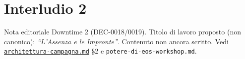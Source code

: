 \chapter*{Interludio 2}
\label{chap:interludio2}

\begin{DndComment}[]{Nota editoriale}
  Downtime 2 (DEC-0018/0019). Titolo di lavoro proposto (non canonico): \textit{``L'Assenza e le Impronte''}. Contenuto non ancora scritto. Vedi \href{https://github.com/fpetrulio/child-of-balance/blob/main/docs/01-campaign-design/architettura-campagna.md}{\texttt{architettura-campagna.md}} §2 e \texttt{potere-di-eos-workshop.md}.
\end{DndComment}
